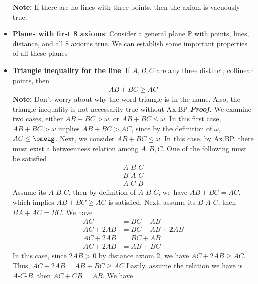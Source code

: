 \documentclass{report}
\begin{document}
\begin{itemize}
            \bigbreak \noindent 
            \textbf{Note:} If there are no lines with three points, then the axiom is vacuously true.
        \item \textbf{Planes with first 8 axioms}: Consider a general plane $\mathbb{P}$ with points, lines, distance, and all 8 axioms true. We can establish some important properties of all these planes
        \item \textbf{Triangle inequality for the line}: If $A,B,C$ are any three distinct, collinear points, then 
            \begin{align*}
                AB + BC \geq AC 
            \end{align*}
            \bigbreak \noindent 
            \textbf{Note:} Don't worry about why the word triangle is in the name. Also, the triangle inequality is not necessarily true without Ax.BP
            \bigbreak \noindent 
            \textbf{\textit{Proof.}} We examine two cases, either $ AB + BC > \omega$, or $AB + BC \leq \omega$. In this first case, $AB +BC > \omega$ implies $AB +BC > AC$, since by the definition of $\omega$, $AC \leq \omeag$.
            \bigbreak \noindent 
            Next, we consider $AB + BC \leq \omega$. In this case, by Ax.BP, there must exist a betweenness relation among $A,B,C$. One of the following must be satisfied
            \begin{align*}
                A\text{-}B\text{-}C \\
                B\text{-}A\text{-}C \\
                A\text{-}C\text{-}B
            \end{align*}
            \bigbreak \noindent 
            Assume its $ A\text{-}B\text{-}C$, then by definition of $ A\text{-}B\text{-}C$, we have $AB + BC = AC$, which implies $AB + BC \geq AC$ is satisfied.
            \bigbreak \noindent 
            Next, assume its $ B\text{-}A\text{-}C$, then $BA + AC = BC$. We have
            \begin{align*}
                AC &= BC - AB \\
                AC + 2AB &= BC - AB + 2AB \\
                AC + 2AB &= BC + AB \\
                AC + 2AB &= AB + BC
            \end{align*}
            In this case, since $2AB > 0$ by distance axiom 2, we have $AC + 2AB \geq AC$. Thus, $AC + 2AB = AB + BC \geq AC $ 
            \bigbreak \noindent 
            Lastly, assume the relation we have is $ A\text{-}C\text{-}B$, then $AC + CB = AB$. We have

\end{itemize}
\end{document}
